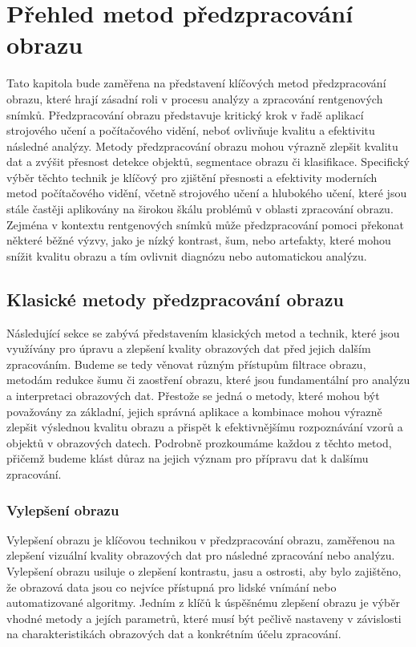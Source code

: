 \documentclass[male,czech,api_ing]{thesis}
\begin{document}
	


\chapter{Přehled metod předzpracování obrazu}
Tato kapitola bude zaměřena na představení klíčových metod předzpracování obrazu, které hrají zásadní roli v procesu analýzy a zpracování rentgenových snímků. Předzpracování obrazu představuje kritický krok v řadě aplikací strojového učení a počítačového vidění, neboť ovlivňuje kvalitu a efektivitu následné analýzy. Metody předzpracování obrazu mohou výrazně zlepšit kvalitu dat a zvýšit přesnost detekce objektů, segmentace obrazu či klasifikace. Specifický výběr těchto technik je klíčový pro zjištění přesnosti a efektivity moderních metod počítačového vidění, včetně strojového učení a hlubokého učení, které jsou stále častěji aplikovány na širokou škálu problémů v oblasti zpracování obrazu. Zejména v kontextu rentgenových snímků může předzpracování pomoci překonat některé běžné výzvy, jako je nízký kontrast, šum, nebo artefakty, které mohou snížit kvalitu obrazu a tím ovlivnit diagnózu nebo automatickou analýzu.\cite{ImportanceOfImageProcessing}

\section{Klasické metody předzpracování obrazu}
Následující sekce se zabývá představením klasických metod a technik, které jsou využívány pro úpravu a zlepšení kvality obrazových dat před jejich dalším zpracováním. Budeme se tedy věnovat různým přístupům filtrace obrazu, metodám redukce šumu či zaostření obrazu, které jsou fundamentální pro analýzu a interpretaci obrazových dat. Přestože se jedná o metody, které mohou být považovány za základní, jejich správná aplikace a kombinace mohou výrazně zlepšit výslednou kvalitu obrazu a přispět k efektivnějšímu rozpoznávání vzorů a objektů v obrazových datech. Podrobně prozkoumáme každou z těchto metod, přičemž budeme klást důraz na jejich význam pro přípravu dat k dalšímu zpracování.

\subsection{Vylepšení obrazu}
Vylepšení obrazu je klíčovou technikou v předzpracování obrazu, zaměřenou na zlepšení vizuální kvality obrazových dat pro následné zpracování nebo analýzu. Vylepšení obrazu usiluje o zlepšení kontrastu, jasu a ostrosti, aby bylo zajištěno, že obrazová data jsou co nejvíce přístupná pro lidské vnímání nebo automatizované algoritmy. 
Jedním z klíčů k úspěšnému zlepšení obrazu je výběr vhodné metody a jejích parametrů, které musí být pečlivě nastaveny v závislosti na charakteristikách obrazových dat a konkrétním účelu zpracování. 
\end{document}
